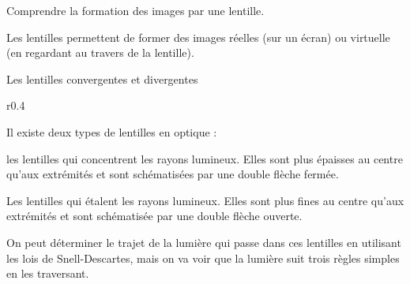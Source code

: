 \tetePremStssVisi
{}

\begin{objectifs}
  \item Comprendre la formation des images par une lentille.
\end{objectifs}

\begin{contexte}
  Les lentilles permettent de former des images réelles (sur un écran) ou virtuelle (en regardant au travers de la lentille).
  
\end{contexte}

\begin{doc}{Les lentilles convergentes et divergentes}
  \begin{wrapfigure}[10]{r}{0.4\linewidth}
    \centering
    \vspace*{-42pt}
  \end{wrapfigure}
  
  Il existe deux types de lentilles en optique : 
  \begin{listePoints}
      \item les lentilles  qui concentrent les rayons lumineux.
      Elles sont plus épaisses au centre qu'aux extrémités et sont schématisées par une double flèche fermée.
      \item Les lentilles  qui étalent les rayons lumineux.
      Elles sont plus fines au centre qu'aux extrémités et sont schématisée par une double flèche ouverte.
  \end{listePoints}

  On peut déterminer le trajet de la lumière qui passe dans ces lentilles en utilisant les lois de Snell-Descartes, mais on va voir que la lumière suit trois règles simples en les traversant.
\end{doc}

